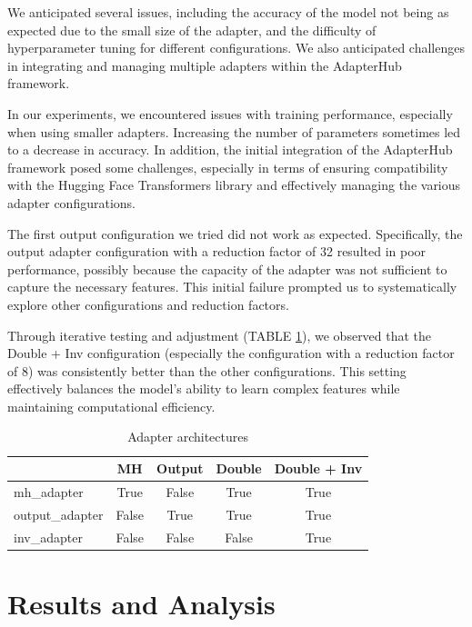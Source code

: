 \documentclass[conference]{IEEEtran}
\begin{document}

We anticipated several issues, including the accuracy of the model not being as expected due to the small size of the adapter, and the difficulty of hyperparameter tuning for different configurations. We also anticipated challenges in integrating and managing multiple adapters within the AdapterHub framework.

In our experiments, we encountered issues with training performance, especially when using smaller adapters. Increasing the number of parameters sometimes led to a decrease in accuracy. In addition, the initial integration of the AdapterHub framework posed some challenges, especially in terms of ensuring compatibility with the Hugging Face Transformers library and effectively managing the various adapter configurations.

The first output configuration we tried did not work as expected. Specifically, the output adapter configuration with a reduction factor of 32 resulted in poor performance, possibly because the capacity of the adapter was not sufficient to capture the necessary features. This initial failure prompted us to systematically explore other configurations and reduction factors.

Through iterative testing and adjustment (TABLE \ref{t1}), we observed that the Double + Inv configuration (especially the configuration with a reduction factor of 8) was consistently better than the other configurations. This setting effectively balances the model's ability to learn complex features while maintaining computational efficiency.

\begin{table}[h]
    \caption{Adapter architectures}
    \centering
    \label{t1}
    \begin{tabular}{|l|c|c|c|c|}
        \hline
        & MH & Output & Double & Double + Inv \\ \hline
        mh\_adapter & True & False & True & True \\ \hline
        output\_adapter & False & True & True & True \\ \hline
        inv\_adapter & False & False & False & True \\ \hline
    \end{tabular}
\end{table}

\section{Results and Analysis}
\end{document}
